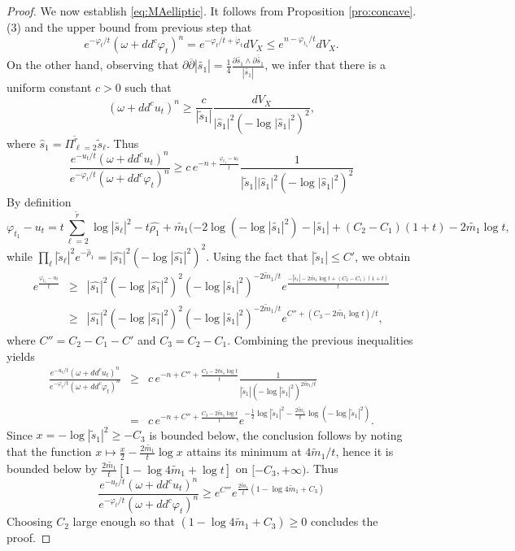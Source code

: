 \documentclass[10pt,a4paper]{amsart}
\numberwithin{equation}{section}
\newcommand{\f}{\varphi}
\begin{document}
\begin{proof}
We now establish \eqref{eq:MAelliptic}.
It follows from Proposition \ref{pro:concave}.(3) and the upper bound from previous step that 
$$
e^{-{\f_t}/{t}}(\omega+dd^c \f_t)^n =e^{-{\f_t}/{t}+\dot{\varphi}_t}  dV_X \leq e^{n-{\f_{t_1}}/{t}} dV_X.
$$
On the other hand, observing that 
$\partial \overline{\partial} |\tilde{s_1}|= \frac{1}{4} \frac{\partial \tilde{s_1}\wedge \overline {\partial \tilde{s_1}}}{|\tilde{s_1}|}$, we infer that 
there is a uniform constant $c>0$ such that 
$$
(\omega+dd^c u_t)^n \geq \frac{c}{|\tilde{s}_1|} \frac{dV_X}{|\hat{s}_1|^2 (-\log |\hat{s}_1|^2)^2},
$$
where   $\hat{s}_1=\Pi_{\ell=2}^{\tilde{r}} \tilde{s}_{\ell}$.
Thus 
$$
 \frac{e^{-{u_t}/{t}}(\omega+dd^c u_t)^n}{e^{-{\varphi_t}/{t}}(\omega+dd^c \varphi_t)^n} \geq 
 c\, e^{-n+\frac{\f_{t_1}-u_t}{t}}  \frac{1}{|\tilde{s}_1||\hat{s}_1|^2 (-\log |\hat{s}_1|^2)^2 }
$$
By definition
$$
\f_{t_1}-u_t= t \sum_{\ell=2}^{\tilde{r}}  \log |\tilde{s_\ell}|^2 -t\hat{\rho_1} +\tilde{m_1} (-2\log (-\log |\tilde{s_1}|^2) -|\tilde{s_1}|+(C_2-C_1)(1+t)-2\tilde{m_1} \log t,
$$
while $\prod_\ell |\tilde{s}_\ell|^2e^{-\hat{\rho}_1}= |\hat{s_1}|^2 (-\log |\hat{s_1}|^2)^2$. 
Using the fact that $|\tilde{s}_1|\leq C'$, we obtain  
\begin{eqnarray*}
 e^{\frac{\f_{t_1}-u_t}{t}} &\geq &  |\hat{s_1}|^2 (-\log |\hat{s_1}|^2)^2 (-\log|\tilde{s_1}|^2)^{-2\tilde{m}_1/t} e^{\frac{-|\tilde{s}_1|-2\tilde{m_1}\log t+(C_2-C_1)(1+t)}{t}}\\
 &\geq & |\hat{s_1}|^2 (-\log |\hat{s_1}|^2)^2 (-\log|\tilde{s_1}|^2)^{-2\tilde{m}_1/t} e^{C''+(C_3-2\tilde{m_1}\log t)/{t}},
  \end{eqnarray*}
  where $C''=C_2-C_1-C'$ and $C_3=C_2-C_1$.
 Combining the previous inequalities yields
 \begin{eqnarray*}
 \frac{e^{-{u_t}/{t}}(\omega+dd^c u_t)^n}{e^{-{\varphi_t}/{t}}(\omega+dd^c \varphi_t)^n} &\geq &  c\, e^{-n +C''+\frac{C_3-2\tilde{m}_1 \log t}{t}} \frac{1}{|\tilde{s}_1| (-\log|\tilde{s}_1|^2)^{2\tilde{m}_1/t}}\\
 &=&   c\, e^{-n +C''+\frac{C_3-2\tilde{m}_1 \log t}{t}} e^{-\frac{1}{2}\log |\tilde{s}_1|^2 - \frac{2\tilde{m}_1}{t}\log(-\log|\tilde{s}_1|^2)}.
 \end{eqnarray*}
Since $x=-\log |\tilde{s}_1|^2 \geq -C_3$ is   bounded below, the conclusion follows by noting that 
the function $x \mapsto \frac{x}{2}-\frac{2\tilde{m_1}}{t} \log x$ attains its minimum at $4\tilde{m}_1/t$, 
hence it is bounded below
by $ \frac{2\tilde{m_1}}{t} [1-\log 4\tilde{m}_1 +\log t]$ on $[-C_3,+\infty)$. Thus
$$\frac{e^{-{u_t}/{t}}(\omega+dd^c u_t)^n}{e^{-{\varphi_t}/{t}}(\omega+dd^c \varphi_t)^n} \geq e^{C'''} e^{\frac{2\tilde{m}_1}{t} (1-\log 4\tilde{m}_1+C_3)}$$
Choosing $C_2$   large enough so that $(1-\log 4\tilde{m}_1+C_3) \geq 0$ concludes the proof.
\end{proof}
\end{document}
